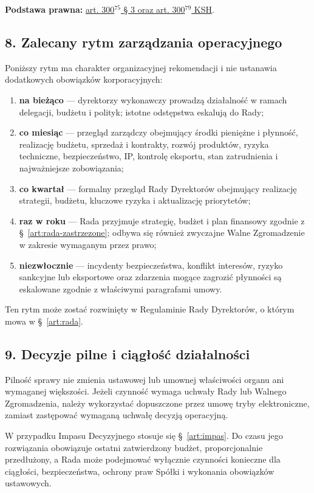 \documentclass[12pt,a4paper]{report}
\newcounter{paragraf}
\begin{document}
\textbf{Podstawa prawna:} \href{https://eli.gov.pl/api/acts/DU/2024/18/text.html}{art. 300$^{75}$ § 3 oraz art. 300$^{79}$ KSH}.

\subsection*{8. Zalecany rytm zarządzania operacyjnego}

Poniższy rytm ma charakter organizacyjnej rekomendacji i nie ustanawia dodatkowych obowiązków korporacyjnych:
\begin{enumerate}
  \item \textbf{na bieżąco} — dyrektorzy wykonawczy prowadzą działalność w ramach delegacji, budżetu i polityk; istotne odstępstwa eskalują do Rady;
  \item \textbf{co miesiąc} — przegląd zarządczy obejmujący środki pieniężne i płynność, realizację budżetu, sprzedaż i kontrakty, rozwój produktów, ryzyka techniczne, bezpieczeństwo, IP, kontrolę eksportu, stan zatrudnienia i najważniejsze zobowiązania;
  \item \textbf{co kwartał} — formalny przegląd Rady Dyrektorów obejmujący realizację strategii, budżetu, kluczowe ryzyka i aktualizację priorytetów;
  \item \textbf{raz w roku} — Rada przyjmuje strategię, budżet i plan finansowy zgodnie z §~\ref{art:rada-zastrzezone}; odbywa się również zwyczajne Walne Zgromadzenie w zakresie wymaganym przez prawo;
  \item \textbf{niezwłocznie} — incydenty bezpieczeństwa, konflikt interesów, ryzyko sankcyjne lub eksportowe oraz zdarzenia mogące zagrozić płynności są eskalowane zgodnie z właściwymi paragrafami umowy.
\end{enumerate}

Ten rytm może zostać rozwinięty w Regulaminie Rady Dyrektorów, o którym mowa w §~\ref{art:rada}.

\subsection*{9. Decyzje pilne i ciągłość działalności}

Pilność sprawy nie zmienia ustawowej lub umownej właściwości organu ani wymaganej większości. Jeżeli czynność wymaga uchwały Rady lub Walnego Zgromadzenia, należy wykorzystać dopuszczone przez umowę tryby elektroniczne, zamiast zastępować wymaganą uchwałę decyzją operacyjną.

W przypadku Impasu Decyzyjnego stosuje się §~\ref{art:impas}. Do czasu jego rozwiązania obowiązuje ostatni zatwierdzony budżet, proporcjonalnie przedłużony, a Rada może podejmować wyłącznie czynności konieczne dla ciągłości, bezpieczeństwa, ochrony praw Spółki i wykonania obowiązków ustawowych.
\end{document}
